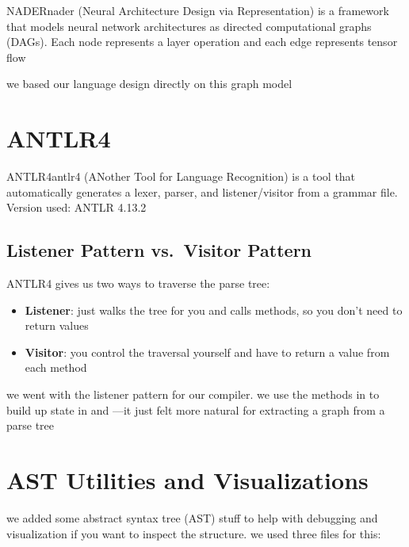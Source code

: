 \documentclass{nngraph-en}
\begin{document}
\begin{dfnbox}{NADER}{nader}
 (Neural Architecture Design via Representation) is a
framework that models neural network architectures as directed
computational graphs (DAGs). Each node represents a layer operation
and each edge represents tensor flow
\end{dfnbox}

we based our language design directly on this graph model

\section{ANTLR4}

\begin{dfnbox}{ANTLR4}{antlr4}
 (ANother Tool for Language Recognition) is a tool
that automatically generates a lexer, parser, and listener/visitor
from a  grammar file.
Version used: ANTLR 4.13.2
\end{dfnbox}

\subsection{Listener Pattern vs.\ Visitor Pattern}

ANTLR4 gives us two ways to traverse the parse tree:

\begin{itemize}
    \item \textbf{Listener}:  just walks the tree for you and calls  methods, so you don't need to return values
    \item \textbf{Visitor}: you control the traversal yourself and have to return a value from each method
\end{itemize}

\begin{notebox}
we went with the listener pattern for our compiler. we use the  methods in  to build up state in  and ---it just felt more natural for extracting a graph from a parse tree
\end{notebox}

\section{AST Utilities and Visualizations}

we added some abstract syntax tree (AST) stuff to help with debugging and visualization if you want to inspect the structure. we used three files for this:
\end{document}
